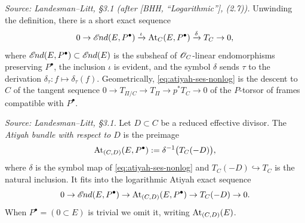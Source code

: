 \begin{remark}
  \label{rem:atiyah-sequence}
  \textit{Source: Landesman--Litt, \S3.1 (after [BHH, ``Logarithmic''], (2.7)).}
  Unwinding the definition, there is a short exact sequence
  \begin{equation}
    \label{eq:atiyah-ses-nonlog}
    0 \to \mathscr{E}\kern -1pt nd(E,P^\bullet) \xrightarrow{\iota} \operatorname{At}_C(E,P^\bullet)
    \xrightarrow{\delta} T_C \to 0,
  \end{equation}
  where $\mathscr{E}\kern -1pt nd(E,P^\bullet) \subset \mathscr{E}\kern -1pt nd(E)$ is the subsheaf of
  $\mathscr{O}_C$-linear endomorphisms preserving $P^\bullet$, the inclusion $\iota$ is
  evident, and the symbol $\delta$ sends $\tau$ to the derivation
  $\delta_\tau: f \mapsto \delta_\tau(f)$. Geometrically,
  \eqref{eq:atiyah-ses-nonlog} is the descent to $C$ of the tangent sequence
  $0 \to T_{\Pi/C} \to T_\Pi \to p^*T_C \to 0$ of the $P$-torsor of frames
  compatible with $P^\bullet$.
\end{remark}

\begin{definition}
  \label{def:atiyah-bundle-divisor}
  \textit{Source: Landesman--Litt, \S3.1.}
  Let $D \subset C$ be a reduced effective divisor. The \emph{Atiyah bundle with
  respect to $D$} is the preimage
  \[
    \operatorname{At}_{(C,D)}(E,P^\bullet) := \delta^{-1}\bigl(T_C(-D)\bigr),
  \]
  where $\delta$ is the symbol map of \eqref{eq:atiyah-ses-nonlog} and
  $T_C(-D) \hookrightarrow T_C$ is the natural inclusion. It fits into the
  logarithmic Atiyah exact sequence
  \begin{equation}
    \label{eq:atiyah-ses-log}
    0 \to \mathscr{E}\kern -1pt nd(E,P^\bullet) \to \operatorname{At}_{(C,D)}(E,P^\bullet)
    \to T_C(-D) \to 0.
  \end{equation}
  When $P^\bullet = (0 \subset E)$ is trivial we omit it, writing
  $\operatorname{At}_{(C,D)}(E)$.
\end{definition}

